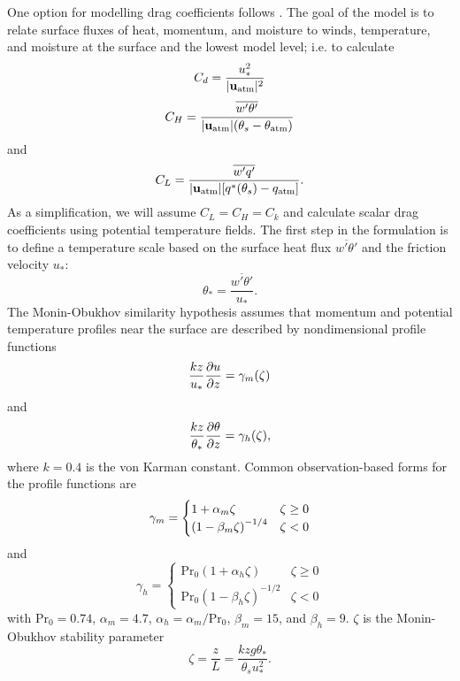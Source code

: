 \documentclass[10pt]{article}
\begin{document}
One option for modelling drag coefficients follows \citet{Byun1990}. The goal of the model is to relate surface fluxes of heat, momentum, and moisture to winds, temperature, and moisture at the surface and the lowest model level; i.e. to calculate
\begin{equation*}
C_d = \frac{u_*^2}{|{\bf u}_{\mathrm{atm}}|^2}
\end{equation*}
\begin{equation*}
C_H = \frac{\overline{w' \theta'}} {|{\bf u}_{\mathrm{atm}}| (\theta_s - \theta_{\mathrm{atm}})}
\end{equation*}
and
\begin{equation*}
C_L = \frac{\overline{w'q'}} {|{\bf u}_{\mathrm{atm}}| \qty [q^*(\theta_s) - q_{\mathrm{atm}}]}.
\end{equation*}
As a simplification, we will assume $C_L = C_H = C_k$ and calculate scalar drag coefficients using potential temperature fields. The first step in the formulation is to define a temperature scale based on the surface heat flux $\overline{w' \theta'}$ and the friction velocity $u_*$:
\begin{equation*}
\theta_* = \frac{\overline{w' \theta'}}{u_*}.
\end{equation*}
The Monin-Obukhov similarity hypothesis assumes that momentum and potential temperature profiles near the surface are described by nondimensional profile functions
\begin{equation*}
\frac{kz}{u_*} \pdv{u}{z} = \gamma_m \qty(\zeta)
\end{equation*}
and
\begin{equation*}
\frac{kz}{\theta_*}\pdv{\theta}{z} = \gamma_h \qty(\zeta),
\end{equation*}
where $k = 0.4$ is the von Karman constant. Common observation-based forms for the profile functions \citep{BusingerEtAl1971} are
\[
\gamma_m = 
\begin{cases}
1 + \alpha_m \zeta & \zeta \ge 0 \\
\qty(1 - \beta_m \zeta)^{-1/4} & \zeta < 0
\end{cases}
\]
and
\[
\gamma_h = 
\begin{cases}
\mathrm{Pr}_0 (1 + \alpha_h \zeta) & \zeta \ge 0 \\
\mathrm{Pr}_0 (1 - \beta_h \zeta)^{-1/2} &  \zeta < 0
\end{cases}
\]
with $\mathrm{Pr}_0 = 0.74$, $\alpha_m = 4.7$, $\alpha_h = \alpha_m/\mathrm{Pr}_0$, $\beta_m = 15$, and $\beta_h = 9$. $\zeta$ is the Monin-Obukhov stability parameter
\begin{equation*}
\zeta = \frac{z}{L} = \frac{k z g \theta_*}{\theta_s u_*^2}.
\end{equation*}
\end{document}

